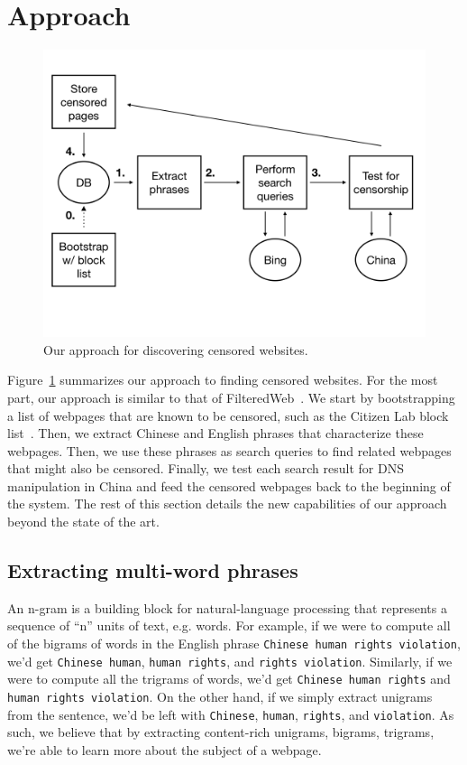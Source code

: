 \section{Approach}

\begin{figure}[t]
  \centering
  \includegraphics[scale=0.23]{figures/arch-2}
  \caption{\label{arch}Our approach for discovering censored websites.}
\end{figure}

Figure~\ref{arch} summarizes our approach to finding censored
websites. For the most part, our approach is similar to that of
FilteredWeb~\cite{darer2017filteredweb}. We start by bootstrapping a
list of webpages that are known to be censored, such as the Citizen
Lab block list~\cite{citizenlab:block}.  Then, we extract Chinese and
English phrases that characterize these webpages.  Then, we use these
phrases as search queries to find related webpages that might also be
censored. Finally, we test each search result for DNS manipulation in
China and feed the censored webpages back to the beginning of the
system. The rest of this section details the new capabilities of our
approach beyond the state of the art.

\subsection{Extracting multi-word phrases}
An n-gram is a building block for natural-language processing that
represents a sequence of ``n'' units of text, e.g. words. For example,
if we were to compute all of the bigrams of words in the English
phrase \texttt{Chinese human rights violation}, we'd get
\texttt{Chinese human}, \texttt{human rights}, and \texttt{rights
violation}. Similarly, if we were to compute all the trigrams of
words, we'd get \texttt{Chinese human rights} and \texttt{human rights
violation}. On the other hand, if we simply extract unigrams from the
sentence, we'd be left with \texttt{Chinese}, \texttt{human},
\texttt{rights}, and \texttt{violation}. As such, we believe that by
extracting content-rich unigrams, bigrams, trigrams, we're able to
learn more about the subject of a webpage.

